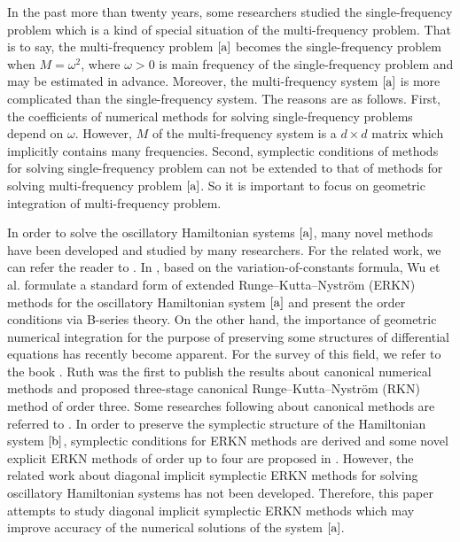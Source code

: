 \documentclass{article}
\begin{document}
 In the past more than twenty
years, some researchers studied the single-frequency problem which
is a kind of special situation of the multi-frequency problem. That
is to say, the multi-frequency problem  $\eqref{a}$  becomes the
single-frequency problem when $M=\omega^{2}$, where $\omega>0$ is
main frequency of the single-frequency problem and may be estimated
in advance. Moreover, the multi-frequency system $\eqref{a}$ is more
complicated than the single-frequency system.  The reasons are as
follows. First, the coefficients of numerical methods for solving
 single-frequency problems depend on $\omega$. However,
$M$ of the multi-frequency system is a $d\times d$ matrix which
implicitly contains many frequencies. Second, symplectic conditions
of methods for solving single-frequency problem can not be extended
to that of methods for solving multi-frequency problem $\eqref{a}$.
So it is important to focus on geometric integration of
multi-frequency problem.

In order to solve the oscillatory Hamiltonian systems $\eqref{a}$,
many novel methods have been developed and studied by many
researchers. For the related work, we can refer the reader to
\cite{wang2016,Wang*2017,Wang*2017*,wu2013-ANM,Wang2017a,wu2015bbb,wu2013-book}.
In \cite{Wu2010}, based on the variation-of-constants formula, Wu et
al. formulate a standard form of  extended Runge--Kutta--Nystr\"{o}m
(ERKN) methods for the oscillatory Hamiltonian system $\eqref{a}$
and present the order conditions via B-series theory. On the other
hand, the importance of geometric numerical integration for the
purpose of preserving some structures of differential equations has
recently become apparent. For the survey of this field, we refer to
the book \cite{Hairer2002}. Ruth \cite{Ruth1983} was the first to
publish the results about canonical numerical methods and proposed
three-stage canonical Runge--Kutta--Nystr\"{o}m (RKN) method of
order three. Some researches following \cite{Ruth1983} about
canonical methods are referred  to
\cite{cohen2005bit,Simos2003,wu-2012-BIT}.  In order to preserve the
symplectic structure of the Hamiltonian system $\eqref{b}$,
symplectic conditions for
 ERKN methods are derived and some novel explicit
 ERKN methods of order up to four are proposed in \cite{wu-2012-BIT}. However, the related work
 about diagonal implicit symplectic  ERKN
methods for solving oscillatory Hamiltonian systems has not been
developed. Therefore, this paper attempts to study  diagonal
implicit symplectic  ERKN methods  which may improve accuracy of the
numerical solutions of the system $\eqref{a}$.
\end{document}
